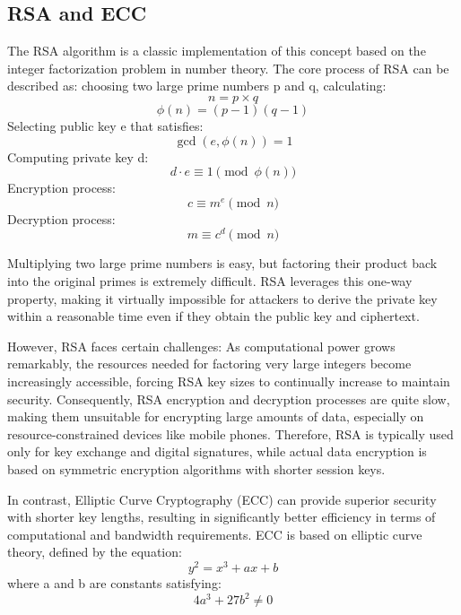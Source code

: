 \documentclass[9pt,a4paper,twoside]{rho-class/rho}
\begin{document}
    
    \subsection{RSA and ECC}
        The RSA algorithm is a classic implementation of this concept based on the integer factorization problem in number theory. The core process of RSA can be described as: choosing two large prime numbers p and q, calculating:
        $$ n = p \times q $$
        $$ \phi(n) = (p-1)(q-1) $$
        Selecting public key e that satisfies:
        $$ \gcd(e, \phi(n)) = 1 $$
        Computing private key d:
        $$ d \cdot e \equiv 1 \pmod{\phi(n)} $$
        Encryption process:
        $$ c \equiv m^e \pmod{n} $$
        Decryption process:
        $$ m \equiv c^d \pmod{n} $$
        
        Multiplying two large prime numbers is easy, but factoring their product back into the original primes is extremely difficult. RSA leverages this one-way property, making it virtually impossible for attackers to derive the private key within a reasonable time even if they obtain the public key and ciphertext. 
        
        However, RSA faces certain challenges: As computational power grows remarkably, the resources needed for factoring very large integers become increasingly accessible, forcing RSA key sizes to continually increase to maintain security. Consequently, RSA encryption and decryption processes are quite slow, making them unsuitable for encrypting large amounts of data, especially on resource-constrained devices like mobile phones. Therefore, RSA is typically used only for key exchange and digital signatures, while actual data encryption is based on symmetric encryption algorithms with shorter session keys.
        
        In contrast, Elliptic Curve Cryptography (ECC) can provide superior security with shorter key lengths, resulting in significantly better efficiency in terms of computational and bandwidth requirements. ECC is based on elliptic curve theory, defined by the equation:
        $$ y^2 = x^3 + ax + b $$ 
        where a and b are constants satisfying:
        $$ 4a^3 + 27b^2 \neq 0 $$
\end{document}
